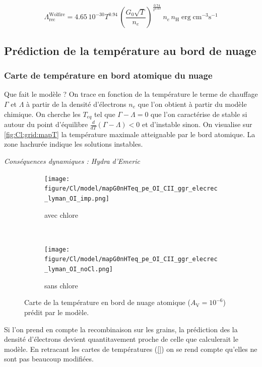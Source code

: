 \begin{equation}
    \Lambda_{\mathrm{rec}}^{\mathrm{Wolfire}} = 4.65\,10^{-30} T^{0.94} \, (\frac{G_0 \sqrt{T}}{n_e})^{\frac{0.74}{T^{0.068}}} \, n_e \, n_\mathrm{H} \operatorname{erg} \mathrm{cm}^{-3} \mathrm{s}^{-1}
\end{equation}


\subsection{Prédiction de la température au bord de nuage}
\subsubsection{Carte de température en bord atomique du nuage}

Que fait le modèle ? On trace en fonction de la température le terme de chauffage $\Gamma$ et $\Lambda$ à partir de la densité d'électrons $n_e$ que l'on obtient à partir du modèle chimique. On cherche les $T_{eq}$ tel que $\Gamma - \Lambda  = 0$ que l'on caractérise de stable si autour du point d'équilibre $\frac{d}{dT}(\Gamma - \Lambda) <0$ et d'instable sinon. On visualise sur \autoref{fig:Cl:grid:mapT} la température maximale atteignable par le bord atomique. La zone hachurée indique les solutions instables.

\textit{Conséquences dynamiques : Hydra d'Emeric}

\begin{figure}[htbp]
    \centering
    \begin{subfigure}[t]{0.45\textwidth} %
        \centering \texttt{[image: figure/Cl/model/mapG0nHTeq\_pe\_OI\_CII\_ggr\_elecrec\_lyman\_OI\_imp.png]}
        \caption{avec chlore}
    \end{subfigure}
    ~ 
    \begin{subfigure}[t]{0.45\textwidth}
        \centering \texttt{[image: figure/Cl/model/mapG0nHTeq\_pe\_OI\_CII\_ggr\_elecrec\_lyman\_OI\_noCl.png]}
        \caption{sans chlore}
    \end{subfigure}
    \caption{Carte de la température en bord de nuage atomique ($A_\mathrm{V}= 10^{-6}$) prédit par le modèle.}
    \label{fig:Cl:model:mapT}
\end{figure}

Si l'on prend en compte la recombinaison sur les grains, la prédiction des la densité d'électrons devient quantitavement proche de celle que calculerait le modèle. En retracant les cartes de températures (\autoref{}) on se rend compte qu'elles ne sont pas beaucoup modifiées.


